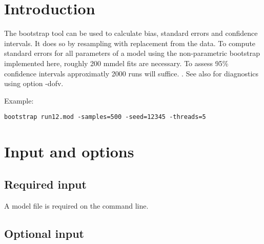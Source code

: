

\usepackage{hyperref}


	
\maketitle
\newcommand{\guidetoolname}{bootstrap}
\tableofcontents
\newpage

\section{Introduction}

The bootstrap tool can be used to calculate bias, standard errors and confidence intervals. 
It does so by resampling with replacement from the data. To compute standard errors for 
all parameters of a model using the non-parametric bootstrap implemented here, roughly 200 
mmdel fits are necessary. To assess 95\% confidence intervals approximatly 2000 runs will suffice.
\cite{Efron}. See also \cite{Niebecker} for diagnostics using option -dofv.

Example:
\begin{verbatim}
bootstrap run12.mod -samples=500 -seed=12345 -threads=5
\end{verbatim}

\section{Input and options}

\subsection{Required input}
A model file is required on the command line.

\subsection{Optional input}
	
